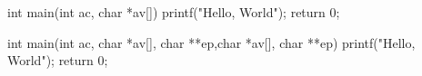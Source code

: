 \documentclass{article}
\begin{document}
\begin{mylisting}
int main(int ac, char *av[]) 
{
  printf("Hello, World");
  return 0;
}
\end{mylisting}

\begin{mylisting}
int main(int ac, char *av[], char **ep,char *av[], char **ep) 
{
  printf("Hello, World");
  return 0;
}
\end{mylisting}
\end{document}
